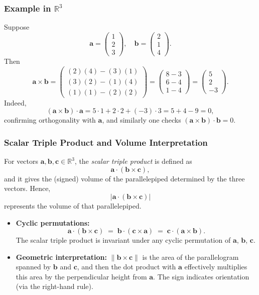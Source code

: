 \subsubsection*{Example in \texorpdfstring{$\mathbb{R}^3$}{R³}}
\noindent
Suppose
\[
\mathbf{a} 
= \begin{pmatrix} 1 \\ 2 \\ 3 \end{pmatrix}, 
\quad
\mathbf{b} 
= \begin{pmatrix} 2 \\ 1 \\ 4 \end{pmatrix}.
\]
Then
\[
\mathbf{a} \times \mathbf{b}
= \begin{pmatrix}
  (2)(4) - (3)(1) \\
  (3)(2) - (1)(4) \\
  (1)(1) - (2)(2)
\end{pmatrix}
= \begin{pmatrix}
  8 - 3 \\
  6 - 4 \\
  1 - 4
\end{pmatrix}
= \begin{pmatrix} 5 \\ 2 \\ -3 \end{pmatrix}.
\]
Indeed, 
\[
(\mathbf{a} \times \mathbf{b}) \cdot \mathbf{a}
= 5\cdot 1 + 2\cdot 2 + (-3)\cdot 3 
= 5 + 4 - 9 
= 0,
\]
confirming orthogonality with $\mathbf{a}$, 
and similarly one checks $(\mathbf{a} \times \mathbf{b}) \cdot \mathbf{b}=0$.

\subsubsection*{Scalar Triple Product and Volume Interpretation}

\noindent
For vectors $\mathbf{a}, \mathbf{b}, \mathbf{c} \in \mathbb{R}^3$, the \emph{scalar triple product} 
is defined as
\[
  \mathbf{a} \cdot (\mathbf{b} \times \mathbf{c}),
\]
and it gives the (signed) volume of the parallelepiped determined by the three vectors. 
Hence,
\[
  \bigl|\mathbf{a} \cdot (\mathbf{b} \times \mathbf{c})\bigr|
\]
represents the volume of that parallelepiped. 

\begin{itemize}
\item \textbf{Cyclic permutations:} 
  \[
    \mathbf{a} \cdot (\mathbf{b} \times \mathbf{c})
    \;=\; \mathbf{b} \cdot (\mathbf{c} \times \mathbf{a})
    \;=\; \mathbf{c} \cdot (\mathbf{a} \times \mathbf{b}).
  \]
  The scalar triple product is invariant under any cyclic permutation of \(\mathbf{a}\), \(\mathbf{b}\), \(\mathbf{c}\).
\item \textbf{Geometric interpretation:} 
  \(\|\mathbf{b} \times \mathbf{c}\|\) is the area of the parallelogram spanned by \(\mathbf{b}\) and \(\mathbf{c}\), 
  and then the dot product with \(\mathbf{a}\) effectively multiplies this area by the perpendicular 
  height from \(\mathbf{a}\). The sign indicates orientation (via the right-hand rule).
\end{itemize}


